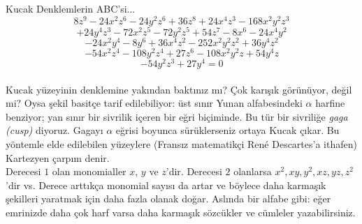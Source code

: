 \begin{surferPage}{Kucak}
Denklemlerin ABC'si...
  \smallskip
\[8z^9-24x^2z^6-24y^2z^6+36z^8+24x^4z^3-168x^2y^2z^3\]
\[+24y^4z^3-72x^2z^5-72y^2z^5+54z^7-8x^6-24x^4y^2\]
\[-24x^2y^4-8y^6 + 36x^4z^2-252x^2y^2z^2+36y^4z^2\]
\[- 54x^2z^4-108y^2z^4 + 27z^6-108x^2y^2z + 54y^4z\]
\[-54y^2z^3 + 27y^4 = 0\]\\
\vspace{0.3cm}
Kucak yüzeyinin denklemine yakından baktınız mı? Çok karışık görünüyor, değil mi?
Oysa şekil basitçe tarif edilebiliyor: üst sınır Yunan alfabesindeki  $\alpha$ harfine benziyor; yan sınır bir sivrilik içeren bir eğri biçiminde. Bu tür bir sivriliğe {\it gaga (cusp)} diyoruz. Gagayı $\alpha$ eğrisi boyunca sürüklerseniz ortaya Kucak çıkar. Bu yöntemle elde edilebilen yüzeylere (Fransız matematikçi Ren\'e Descartes'a ithafen) Kartezyen çarpım denir.\\
\vspace{0.3cm}
Derecesi $1$ olan monomialler $x$, $y$ ve  $z$'dir. Derecesi  $2$ olanlarsa $x^2, xy, y^2, xz, yz, z^2$'dir vs. Derece arttıkça monomial sayısı da artar ve böylece daha karmaşık şekilleri yaratmak için daha fazla olanak doğar. Aslında bir alfabe gibi: eğer emrinizde daha çok harf varsa daha karmaşık sözcükler ve cümleler yazabilirsiniz.
\end{surferPage}
